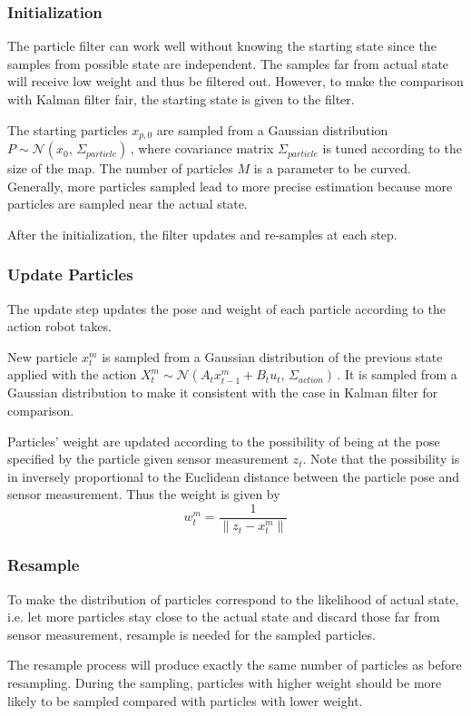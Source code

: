 \documentclass[letterpaper,11pt]{article}
\begin{document}
\subsubsection{Initialization}
The particle filter can work well without knowing the starting state since the samples from possible state are independent. The samples far from actual state will receive low weight and thus be filtered out. However, to make the comparison with Kalman filter fair, the starting state is given to the filter.

The starting particles $x_{p,0}$ are sampled from a Gaussian distribution $P \sim \mathcal{N}(x_0,\,\Sigma_{particle})\,$, where covariance matrix $\Sigma_{particle}$ is tuned according to the size of the map. The number of particles $M$ is a parameter to be curved. Generally, more particles sampled lead to more precise estimation because more particles are sampled near the actual state.

After the initialization, the filter updates and re-samples at each step.

\subsubsection{Update Particles}
The update step updates the pose and weight of each particle according to the action robot takes.

New particle $x_t^m$ is sampled from a Gaussian distribution of the previous state applied with the action $X_t^m \sim \mathcal{N}(A_t x_{t-1}^m + B_t u_t,\,\Sigma_{action})\,$. It is sampled from a Gaussian distribution to make it consistent with the case in Kalman filter for comparison.

Particles' weight are updated according to the possibility of being at the pose specified by the particle given sensor measurement $z_t$. Note that the possibility is in inversely proportional to the Euclidean distance between the particle pose and sensor measurement. Thus the weight is given by
$$w_t^m = \frac{1}{\| z_t - x_t^m \|}$$

\subsubsection{Resample}
To make the distribution of particles correspond to the likelihood of actual state, i.e. let more particles stay close to the actual state and discard those far from sensor measurement, resample is needed for the sampled particles.

The resample process will produce exactly the same number of particles as before resampling. During the sampling, particles with higher weight should be more likely to be sampled compared with particles with lower weight.
\end{document}
